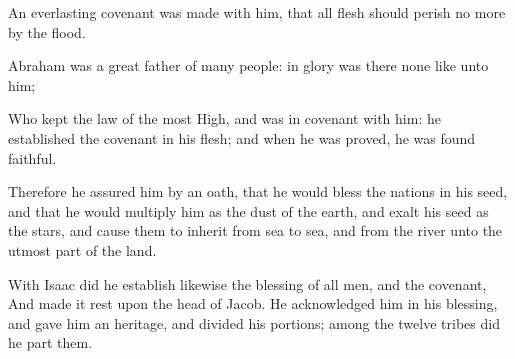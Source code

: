 {\par }{\PP {}An everlasting covenant was made with him, that all flesh should perish no more by the flood.
\par }{\PP {}Abraham was a great father of many people: in glory was there none like unto him;
\par }{\PP {}Who kept the law of the most High, and was in covenant with him: he established the covenant in his flesh; and when he was proved, he was found faithful.
\par }{\PP {}Therefore he assured him by an oath, that he would bless the nations in his seed, and that he would multiply him as the dust of the earth, and exalt his seed as the stars, and cause them to inherit from sea to sea, and from the river unto the utmost part of the land.
\par }{\PP {}With Isaac did he establish likewise
{} the blessing of all men, and the covenant,
And made it rest upon the head of Jacob. He acknowledged him in his blessing, and gave him an heritage, and divided his portions; among the twelve tribes did he part them.

}
